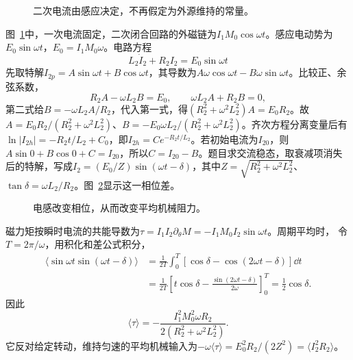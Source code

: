 \begin{figure}[H]\centering
{}
\caption{二次电流由感应决定，不再假定为外源维持的常量。}\label{fig:i2-h8-q}
\end{figure}
\begin{solution}
图~\ref{fig:i2-h8-q}中，一次电流固定，二次闭合回路的外磁链为$I_1M_0\cos\omega t$。感应电动势为$E_0\sin\omega t$，$E_0=I_1M_0\omega$。电路方程
\[L_2\dot I_2+R_2I_2=E_0\sin\omega t
\]
先取特解$I_{2p}=A\sin\omega t+B\cos\omega t$，其导数为$A\omega\cos\omega t-B\omega\sin\omega t$。比较正、余弦系数，
\[R_2A-\omega L_2B=E_0,\qquad \omega L_2A+R_2B=0,\]
第二式给$B=-\omega L_2A/R_2$，代入第一式，得$(R_2^2+\omega^2L_2^2)A=E_0R_2$。故$A=E_0R_2/(R_2^2+\omega^2L_2^2)$、$B=-E_0\omega L_2/(R_2^2+\omega^2L_2^2)$。齐次方程分离变量后有$\ln|I_{2h}|=-R_2t/L_2+C_0$，即$I_{2h}=Ce^{-R_2t/L_2}$。若初始电流为$I_{20}$，则$A\sin0+B\cos0+C=I_{20}$，所以$C=I_{20}-B$。题目求交流稳态，取衰减项消失后的特解，写成$I_2=(E_0/Z)\sin(\omega t-\delta)$，其中$Z=\sqrt{R_2^2+\omega^2L_2^2}$、$\tan\delta=\omega L_2/R_2$。图~\ref{fig:i2-h8-s}显示这一相位差。


\begin{figure}[H]\centering
{}
\caption{电感改变相位，从而改变平均机械阻力。}\label{fig:i2-h8-s}
\end{figure}

磁力矩按瞬时电流的共能导数为$\tau=I_1I_2\partial_\theta M=-I_1M_0I_2\sin\omega t$。周期平均时，
令$T=2\pi/\omega$，用积化和差公式积分，
\[\begin{aligned}
\langle\sin\omega t\sin(\omega t-\delta)\rangle
&=\frac1{2T}\int_0^T[\cos\delta-\cos(2\omega t-\delta)]\dd t\\
&=\frac1{2T}\left[t\cos\delta-\frac{\sin(2\omega t-\delta)}{2\omega}\right]_0^T
=\frac12\cos\delta.
\end{aligned}\]
因此
\[\boxed{\langle\tau\rangle
=-\frac{I_1^2M_0^2\omega R_2}{2(R_2^2+\omega^2L_2^2)}}.
\]
它反对给定转动，维持匀速的平均机械输入为$-\omega\langle\tau\rangle=E_0^2R_2/(2Z^2)=\langle I_2^2R_2\rangle$。


\end{solution}
